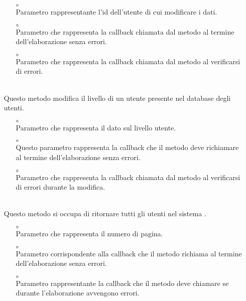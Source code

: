 \begin{itemize}
\begin{itemize}
\item[$\circ$]  \\ Parametro rappresentante l'id dell'utente di cui modificare i dati.
\item[$\circ$]  \\ Parametro che rappresenta la callback chiamata dal metodo al termine dell'elaborazione senza errori.
\item[$\circ$]  \\ Parametro che rappresenta la callback chiamata dal metodo al verificarsi di errori.
\end{itemize}
\item[]  \\ Questo metodo modifica il livello di un utente presente nel database degli utenti.
\begin{itemize}\addtolength{\itemsep}{-0.5\baselineskip}
\item[$\circ$]  \\ Parametro che rappresenta il dato sul livello utente.
\item[$\circ$]  \\ Questo parametro rappresenta la callback che il metodo deve richiamare al termine dell'elaborazione senza errori.
\item[$\circ$]  \\ Parametro che rappresenta la callback chiamata dal metodo al verificarsi di errori durante la modifica.
\end{itemize}
\item[]  \\ Questo metodo si occupa di ritornare tutti gli utenti nel sistema .
\begin{itemize}\addtolength{\itemsep}{-0.5\baselineskip}
\item[$\circ$]  \\ Parametro che rappresenta il numero di pagina.
\item[$\circ$]  \\ Parametro corrispondente alla callback che il metodo richiama al termine dell'elaborazione senza errori.
\item[$\circ$]  \\ Parametro rappresentante la callback che il metodo deve chiamare se durante l'elaborazione avvengono errori.

\end{itemize}
\end{itemize}
